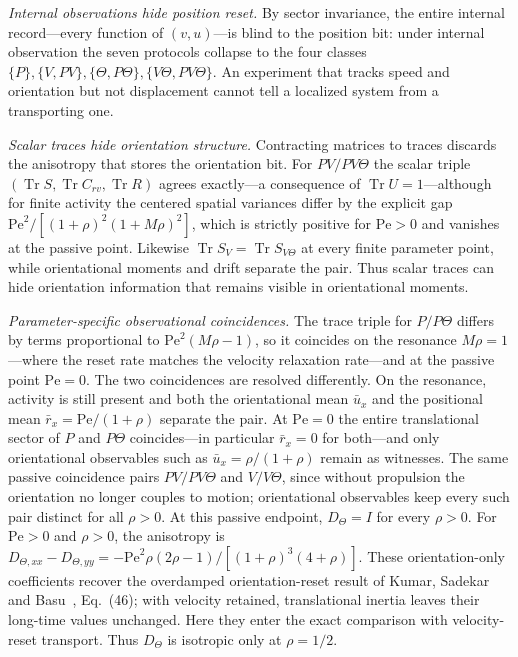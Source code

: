 \emph{Internal observations hide position reset.} By sector invariance, the entire internal record---every function of $(v,u)$---is blind to the position bit: under internal observation the seven protocols collapse to the four classes $\{P\},\{V,PV\},\{\Theta,P\Theta\},\{V\Theta,PV\Theta\}$. An experiment that tracks speed and orientation but not displacement cannot tell a localized system from a transporting one.

\emph{Scalar traces hide orientation structure.} Contracting matrices to traces discards the anisotropy that stores the orientation bit. For $PV/PV\Theta$ the scalar triple $(\operatorname{Tr}S,\operatorname{Tr}C_{rv},\operatorname{Tr}R)$ agrees exactly---a consequence of $\operatorname{Tr}U=1$---although for finite activity the centered spatial variances differ by the explicit gap $\mathrm{Pe}^2/[(1+\rho)^2(1+M\rho)^2]$, which is strictly positive for $\mathrm{Pe}>0$ and vanishes at the passive point. Likewise $\operatorname{Tr}S_V=\operatorname{Tr}S_{V\Theta}$ at every finite parameter point, while orientational moments and drift separate the pair. Thus scalar traces can hide orientation information that remains visible in orientational moments.

\emph{Parameter-specific observational coincidences.} The trace triple for $P/P\Theta$ differs by terms proportional to $\mathrm{Pe}^2(M\rho-1)$, so it coincides on the resonance $M\rho=1$---where the reset rate matches the velocity relaxation rate---and at the passive point $\mathrm{Pe}=0$. The two coincidences are resolved differently. On the resonance, activity is still present and both the orientational mean $\bar u_x$ and the positional mean $\bar r_x=\mathrm{Pe}/(1+\rho)$ separate the pair. At $\mathrm{Pe}=0$ the entire translational sector of $P$ and $P\Theta$ coincides---in particular $\bar r_x=0$ for both---and only orientational observables such as $\bar u_x=\rho/(1+\rho)$ remain as witnesses. The same passive coincidence pairs $PV/PV\Theta$ and $V/V\Theta$, since without propulsion the orientation no longer couples to motion; orientational observables keep every such pair distinct for all $\rho>0$. At this passive endpoint, $D_\Theta=I$ for every $\rho>0$. For $\mathrm{Pe}>0$ and $\rho>0$, the anisotropy is $D_{\Theta,xx}-D_{\Theta,yy}=-\mathrm{Pe}^2\rho(2\rho-1)/[(1+\rho)^3(4+\rho)]$. These orientation-only coefficients recover the overdamped orientation-reset result of Kumar, Sadekar and Basu~\cite{KumarSadekarBasu}, Eq.~(46); with velocity retained, translational inertia leaves their long-time values unchanged. Here they enter the exact comparison with velocity-reset transport. Thus $D_\Theta$ is isotropic only at $\rho=1/2$.

